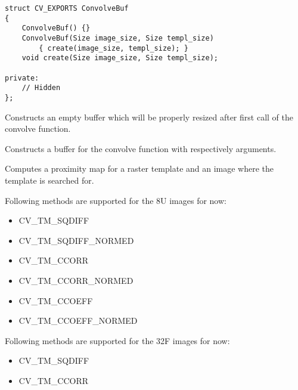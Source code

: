 \begin{lstlisting}
struct CV_EXPORTS ConvolveBuf
{
    ConvolveBuf() {}
    ConvolveBuf(Size image_size, Size templ_size) 
        { create(image_size, templ_size); }
    void create(Size image_size, Size templ_size);

private:
    // Hidden
};
\end{lstlisting}



Constructs an empty buffer which will be properly resized after first call of the convolve function.

Constructs a buffer for the convolve function with respectively arguments.


Computes a proximity map for a raster template and an image where the template is searched for.


\begin{description}
\end{description}
Following methods are supported for the 8U images for now:
\begin{itemize}
\item CV\_TM\_SQDIFF \item CV\_TM\_SQDIFF\_NORMED \item CV\_TM\_CCORR \item CV\_TM\_CCORR\_NORMED \item CV\_TM\_CCOEFF \item CV\_TM\_CCOEFF\_NORMED 
\end{itemize}
Following methods are supported for the 32F images for now:
\begin{itemize}
\item CV\_TM\_SQDIFF \item CV\_TM\_CCORR
\end{itemize}

